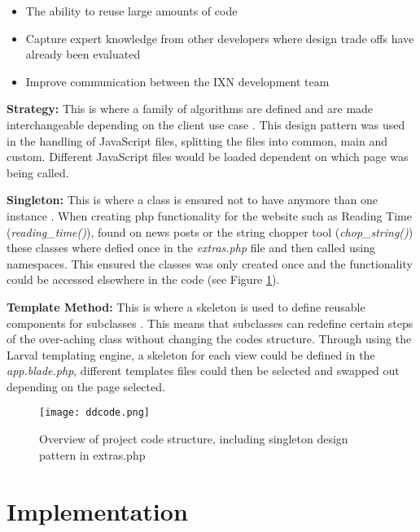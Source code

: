 \begin{itemize}
\tightlist
\item
  The ability to reuse large amounts of code \cite{deanDesignPatterns}
\item
  Capture expert knowledge from other developers where design trade offs
  have already been evaluated
\item
  Improve communication between the IXN development team
\end{itemize}

\textbf{Strategy:} This is where a family of algorithms are defined and
are made interchangeable depending on the client use case
\cite{gamma1995design}. This design pattern was used in the handling of
JavaScript files, splitting the files into common, main and custom.
Different JavaScript files would be loaded dependent on which page was
being called.

\textbf{Singleton:} This is where a class is ensured not to have anymore
than one instance \cite{gamma1995design}. When creating php
functionality for the website such as Reading Time
(\emph{reading\_time()}), found on news posts or the string chopper tool
(\emph{chop\_string()}) these classes where defied once in the
\emph{extras.php} file and then called using namespaces. This ensured
the classes was only created once and the functionality could be
accessed elsewhere in the code (see Figure \ref{ddcode}).

\textbf{Template Method:} This is where a skeleton is used to define
reusable components for subclasses \cite{gamma1995design}. This means
that subclasses can redefine certain steps of the over-aching class
without changing the codes structure. Through using the Larval
templating engine, a skeleton for each view could be defined in the
\emph{app.blade.php}, different templates files could then be selected
and swapped out depending on the page selected.

\begin{figure}[H]
\centering
\texttt{[image: ddcode.png]}
\caption{Overview of project code structure, including singleton design pattern in extras.php}
\label{ddcode}
\end{figure}

\newpage

\hypertarget{implementation}{%
\section{Implementation}\label{implementation}}

